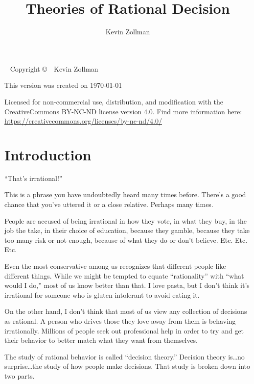 \documentclass[justified,nobib]{tufte-book}
\title{Theories of Rational Decision}
\author{Kevin Zollman}
\begin{document}
\maketitle

\newpage
\begin{fullwidth}
~\vfill
\thispagestyle{empty}
\setlength{\parindent}{0pt}
\setlength{\parskip}{\baselineskip}
Copyright \copyright\ \the\year\ Kevin Zollman

\par This version was created on \today

\par Licensed for non-commercial use, distribution, and modification with the CreativeCommons BY-NC-ND license version 4.0. Find more information here: \url{https://creativecommons.org/licenses/by-nc-nd/4.0/}


\end{fullwidth}

\tableofcontents

\chapter{Introduction}

``That's irrational!''

This is a phrase you have undoubtedly heard many times before. There's a good chance that you've uttered it or a close relative.  Perhaps many times.  

People are accused of being irrational in how they vote, in what they buy, in the job the take, in their choice of education, because they gamble, because they take too many risk or not enough, because of what they do or don't believe. Etc. Etc. Etc.

Even the most conservative among us recognizes that different people like different things.  While we might be tempted to equate ``rationality'' with ``what would I do,'' most of us know better than that.  I love pasta, but I don't think it's irrational for someone who is gluten intolerant to avoid eating it.

On the other hand, I don't think that most of us view any collection of decisions as rational. A person who drives those they love away from them is behaving irrationally. Millions of people seek out professional help in order to try and get their behavior to better match what they want from themselves.

The study of rational behavior is called ``decision theory.'' Decision theory is\dots no surprise\dots the study of how people make decisions.  That study is broken down into two parts.
\end{document}
